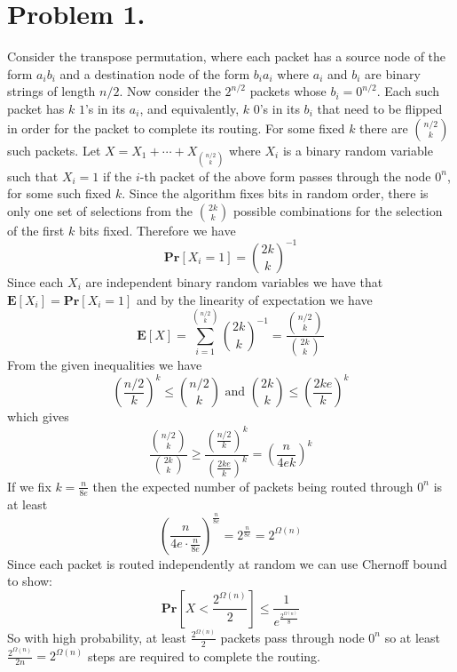 \documentclass[12pt]{article}
\begin{document}
\pagestyle{plain}
\titleformat{\subsection}[runin]
  {\normalfont\large\bfseries}{\thesubsection}{1em}{}
\titleformat{\subsubsection}[runin]
  {\normalfont\large\bfseries}{\thesubsubsection}{1em}{}

\section*{Problem 1.}
Consider the transpose permutation, where each packet has a source node of
the form $a_ib_i$ and a destination node of the form $b_ia_i$ where $a_i$
and $b_i$ are binary strings of length $n/2$. Now consider the
$2^{n/2}$ packets whose $b_i = 0^{n/2}$. Each such packet has $k$ $1$'s in its
$a_i$, and equivalently, $k$ $0$'s in its $b_i$ that need to be flipped in order
for the packet to complete its routing. For some fixed $k$ there are
${n/2 \choose k}$ such packets. Let $X = X_1 + \cdots + X_{{n/2 \choose k}}$
where $X_i$ is a binary random variable such that $X_i = 1$ if the $i$-th
packet of the above form passes through the node $0^n$, for some such fixed $k$.
Since the algorithm fixes bits in random order, there is only one set of
selections from the ${2k \choose k}$ possible combinations for the selection of the first $k$ bits
fixed. Therefore we have
$$\textbf{Pr}[X_i = 1] = {2k \choose k}^{-1}$$
Since each $X_i$ are independent binary random variables we have that
$\textbf{E}[X_i] = \textbf{Pr}[X_i = 1]$ and by the linearity of expectation
we have
$$\textbf{E}[X] = \sum_{i=1}^{{n/2 \choose k}} {2k \choose k}^{-1} =
\frac{{n/2 \choose k}}{{2k \choose k}}$$
From the given inequalities we have
$$\left(\frac{n/2}{k}\right)^k \le {n/2 \choose k} \text{ and }
{2k \choose k} \le \left(\frac{2ke}{k}\right)^k$$
which gives
$$\frac{{n/2 \choose k}}{{2k \choose k}} \ge
\frac{\left(\frac{n/2}{k}\right)^k}{\left(\frac{2ke}{k}\right)^k} =
\left(\frac{n}{4ek}\right)^k$$
If we fix $k = \frac{n}{8e}$ then the expected number of packets being routed
through $0^n$ is at least
$$\left(\frac{n}{4e\cdot \frac{n}{8e}}\right)^{\frac{n}{8e}} =
2^{\frac{n}{8e}} = 2^{\Omega(n)}$$
Since each packet is routed independently at random we can use Chernoff bound to
show:
$$\textbf{Pr}[X < \frac{2^{\Omega(n)}}{2}]
\le \frac{1}{e^{\frac{2^{\Omega(n)}}{8}}}$$
So with high probability, at least $\frac{2^{\Omega(n)}}{2}$ packets pass
through node $0^n$ so at least $\frac{2^{\Omega(n)}}{2n} = 2^{\Omega(n)}$ steps are
required to complete the routing.
\end{document}
